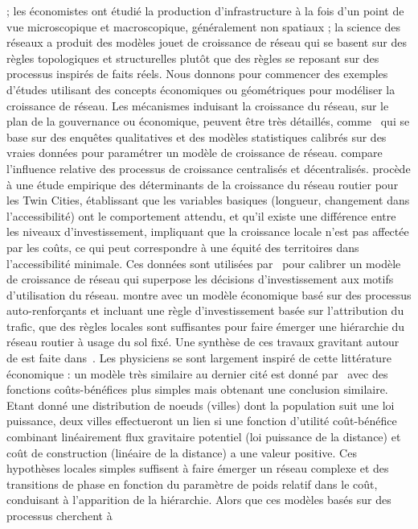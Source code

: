 {; les économistes ont étudié la production d'infrastructure à la fois d'un point de vue microscopique et macroscopique, généralement non spatiaux ; la science des réseaux a produit des modèles jouet de croissance de réseau qui se basent sur des règles topologiques et structurelles plutôt que des règles se reposant sur des processus inspirés de faits réels. Nous donnons pour commencer des exemples d'études utilisant des concepts économiques ou géométriques pour modéliser la croissance de réseau. Les mécanismes induisant la croissance du réseau, sur le plan de la gouvernance ou économique, peuvent être très détaillés, comme~\cite{levinson2012forecasting} qui se base sur des enquêtes qualitatives et des modèles statistiques calibrés sur des vraies données pour paramétrer un modèle de croissance de réseau. \cite{xie2009jurisdictional} compare l'influence relative des processus de croissance centralisés et décentralisés. \cite{levinson2003induced} procède à une étude empirique des déterminants de la croissance du réseau routier pour les Twin Cities, établissant que les variables basiques (longueur, changement dans l'accessibilité) ont le comportement attendu, et qu'il existe une différence entre les niveaux d'investissement, impliquant que la croissance locale n'est pas affectée par les coûts, ce qui peut correspondre à une équité des territoires dans l'accessibilité minimale. Ces données sont utilisées par~\cite{zhang2016model} pour calibrer un modèle de croissance de réseau qui superpose les décisions d'investissement aux motifs d'utilisation du réseau. \cite{yerra2005emergence} montre avec un modèle économique basé sur des processus auto-renforçants et incluant une règle d'investissement basée sur l'attribution du trafic, que des règles locales sont suffisantes pour faire émerger une hiérarchie du réseau routier à usage du sol fixé. Une synthèse de ces travaux gravitant autour de  est faite dans~\cite{xie2011evolving}. Les physiciens se sont largement inspiré de cette littérature économique : un modèle très similaire au dernier cité est donné par~\cite{louf2013emergence} avec des fonctions coûts-bénéfices plus simples mais obtenant une conclusion similaire. Etant donné une distribution de noeuds (villes) dont la population suit une loi puissance, deux villes effectueront un lien si une fonction d'utilité coût-bénéfice combinant linéairement flux gravitaire potentiel (loi puissance de la distance) et coût de construction (linéaire de la distance) a une valeur positive. Ces hypothèses locales simples suffisent à faire émerger un réseau complexe et des transitions de phase en fonction du paramètre de poids relatif dans le coût, conduisant à l'apparition de la hiérarchie. Alors que ces modèles basés sur des processus cherchent à }
